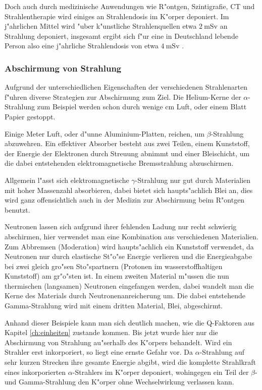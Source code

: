 \documentclass[12pt]{article}
\begin{document}
Doch auch durch medizinische Anwendungen wie R"ontgen, Szintigrafie, CT und Strahlentherapie wird einiges an Strahlendosis im K"orper deponiert. Im j"ahrlichen Mittel wird "uber k"unstliche Strahlenquellen etwa $\SI{2}{\milli\sievert}$ an Strahlung deponiert, insgesamt ergibt sich f"ur eine in Deutschland lebende Person also eine j"ahrliche Strahlendosis von etwa $\SI{4}{\milli\sievert}$ \cite{cite4}. 


\subsubsection{Abschirmung von Strahlung}

Aufgrund der unterschiedlichen Eigenschaften der verschiedenen Strahlenarten f"uhren diverse Strategien zur Abschirmung zum Ziel. Die Helium-Kerne der $\alpha$-Strahlung zum Beispiel werden schon durch wenige $\si{\centi\meter}$ Luft, oder einem Blatt Papier gestoppt. \par 
Einige Meter Luft, oder d"unne Aluminium-Platten, reichen, um $\beta$-Strahlung abzuwehren. Ein effektiver Absorber besteht aus zwei Teilen, einem Kunststoff, der Energie der Elektronen durch Streuung abnimmt und einer Bleischicht, um die dabei entstehenden elektromagnetische Bremsstrahlung abzuschirmen.
\par 
Allgemein l"asst sich elektromagnetische $\gamma$-Strahlung  nur gut durch Materialien mit hoher Massenzahl absorbieren, dabei bietet sich haupts"achlich Blei an, dies wird ganz offensichtlich auch in der Medizin zur Abschirmung beim R"ontgen benutzt. \par  
Neutronen lassen sich aufgrund ihrer fehlenden Ladung nur recht schwierig abschirmen, hier verwendet man eine Kombination aus verschiedenen Materialien. Zum Abbremsen (Moderation) wird haupts"achlich ein Kunststoff verwendet, da Neutronen nur durch elastische St"o"se Energie verlieren und die Energieabgabe bei zwei gleich gro"sen Sto"spartnern (Protonen im wasserstoffhaltigen Kunststoff) am gr"o"sten ist. In einem zweiten Material m"ussen die nun thermischen (langsamen) Neutronen eingefangen werden, dabei wandelt man die Kerne des Materials durch Neutronenanreicherung um. Die dabei entstehende Gamma-Strahlung wird mit einem dritten Material, Blei, abgeschirmt. \par 
Anhand dieser Beispiele kann man sich deutlich machen, wie die Q-Faktoren aus Kapitel \ref{ch:einheiten} zustande kommen. Bis jetzt wurde hier nur die Abschirmung von Strahlung au"serhalb des K"orpers behandelt. Wird ein Strahler erst inkorporiert, so liegt eine ernste Gefahr vor. Da $\alpha$-Strahlung auf sehr kurzen Strecken ihre gesamte Energie abgibt, wird die komplette Strahlkraft eines inkorporierten $\alpha$-Strahlers im K"orper deponiert, wohingegen ein Teil der $\beta$- und Gamma-Strahlung den K"orper ohne Wechselwirkung verlassen kann. \par 
\end{document}
